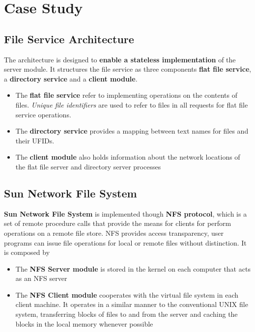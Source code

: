\section{Case Study}
\subsection{File Service Architecture}
The architecture is designed to \textbf{enable a stateless implementation} of the server module. It structures the file service as three components \textbf{flat file service}, a \textbf{directory service} and a \textbf{client module}.


\begin{itemize}
    \item The \textbf{flat file service} refer to implementing operations on the contents of files. \textit{Unique file identifiers} are used to refer to files in all requests for flat file service operations.
    \item The \textbf{directory service} provides a mapping between text names for files and their UFIDs.
    \item The \textbf{client module }also holds information about the network locations of the flat file server and directory server processes
\end{itemize}

\subsection{Sun Network File System}
\textbf{Sun Network File System} is implemented though \textbf{NFS protocol}, which is a set of remote procedure calls that provide the means for clients for perform operations on a remote file store. NFS provides access transparency, user programs can issue file operations for local or remote files without distinction. It is composed by
\begin{itemize}
    \item The \textbf{NFS Server module} is stored in the kernel on each computer that acts as an NFS server
    \item The \textbf{NFS Client module} cooperates with the virtual file system in each client machine. It operates in a similar manner to the conventional UNIX file system, transferring blocks of files to and from the server and caching the blocks in the local memory whenever possible
\end{itemize}


